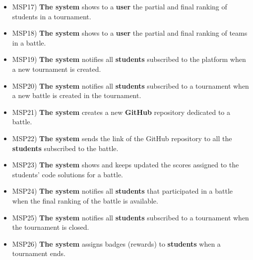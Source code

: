 \begin{itemize}
		\item MSP17) \textbf{The system} shows to a \textbf{user} the partial and final ranking of students in a tournament.
		\item MSP18) \textbf{The system} shows to a \textbf{user} the partial and final ranking of teams in a battle.
		\item MSP19) \textbf{The system} notifies all \textbf{students} subscribed to the platform when a new tournament is created.
		\item MSP20) \textbf{The system} notifies all \textbf{students} subscribed to a tournament when a new battle is created in the tournament.
		\item MSP21) \textbf{The system} creates a new \textbf{GitHub} repository dedicated to a battle.
		\item MSP22) \textbf{The system} sends the link of the GitHub repository to all the \textbf{students} subscribed to the battle.
		\item MSP23) \textbf{The system} shows and keeps updated the scores assigned to the students' code solutions for a battle.
		\item MSP24) \textbf{The system} notifies all \textbf{students} that participated in a battle when the final ranking of the battle is available.
		\item MSP25) \textbf{The system} notifies all \textbf{students} subscribed to a tournament when the tournament is closed.
		\item MSP26) \textbf{The system} assigns badges (rewards) to \textbf{students} when a tournament ends.
	\end{itemize}